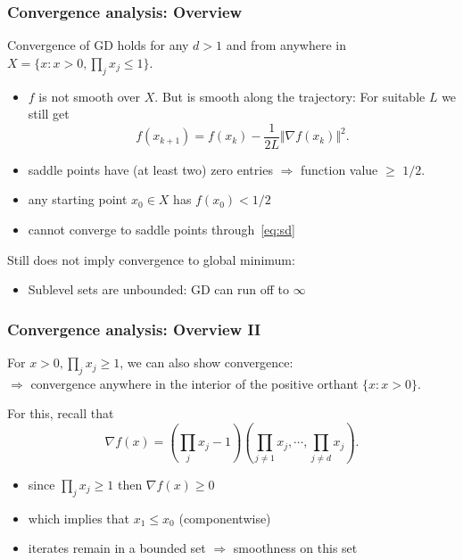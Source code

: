\documentclass[aspectratio=149]{beamer}
\begin{document}
\begin{frame}
  \frametitle{Convergence analysis: Overview}
  Convergence of GD holds for any $d>1$ and from anywhere in $X=\{x: x> 0, \prod_j x_j \le 1\}$.
  \begin{itemize}
    \item $f$ is not smooth over $X$.
          But is smooth along the trajectory: For suitable $L$ we still get
          \begin{equation}\tag{SD}
            \label{eq:sd}
            f(x_{k+1}) = f(x_k) - \frac{1}{2L} \Vert \nabla f(x_k) \Vert^2.
          \end{equation}
    \item saddle points have (at least two) zero entries $\Rightarrow$ function value $\ge$ $1/2$.
    \item any starting point $x_0 \in X$ has $f(x_0) < 1/2$
    \item cannot converge to saddle points through~\eqref{eq:sd}
  \end{itemize}

  Still does not imply convergence to global minimum:
  \begin{itemize}
    \item Sublevel sets are unbounded: GD can run off to $\infty$
  \end{itemize}

\end{frame}


\begin{frame}
  \frametitle{Convergence analysis: Overview II}

  For $x> 0, \prod_j x_j \ge 1$, we can also show convergence: \\
  $\Rightarrow$ convergence anywhere in the interior of the positive orthant $\{x: x> 0\}$.

  For this, recall that
  \begin{equation}
    \nabla f(x) = \left( \prod_j x_j - 1\right) \left( \prod_{j\neq1} x_j, \cdots, \prod_{j\neq d}x_j \right).
  \end{equation}

  \begin{itemize}
    \item since $\prod_j x_j \ge 1$ then $\nabla f(x) \ge 0$
    \item which implies that $x_{1} \le x_0$ (componentwise)
    \item iterates remain in a bounded set $\Rightarrow$ smoothness on this set
  \end{itemize}

\end{frame}
\end{document}
